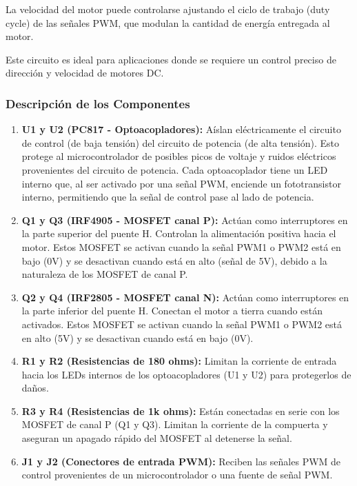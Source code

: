 \documentclass{article}
\begin{document}
La velocidad del motor puede controlarse ajustando el ciclo de trabajo (duty cycle) de las señales PWM, que modulan la cantidad de energía entregada al motor.

Este circuito es ideal para aplicaciones donde se requiere un control preciso de dirección y velocidad de motores DC.

\subsubsection{Descripción de los Componentes}

\begin{enumerate}

    \item \textbf{U1 y U2 (PC817 - Optoacopladores):} Aíslan eléctricamente el circuito de control (de baja tensión) del circuito de potencia (de alta tensión). Esto protege al microcontrolador de posibles picos de voltaje y ruidos eléctricos provenientes del circuito de potencia.
    Cada optoacoplador tiene un LED interno que, al ser activado por una señal PWM, enciende un fototransistor interno, permitiendo que la señal de control pase al lado de potencia.
    
    \item \textbf{Q1 y Q3 (IRF4905 - MOSFET canal P):} Actúan como interruptores en la parte superior del puente H. Controlan la alimentación positiva hacia el motor. Estos MOSFET se activan cuando la señal PWM1 o PWM2 está en bajo (0V) y se desactivan cuando está en alto (señal de 5V), debido a la naturaleza de los MOSFET de canal P.
    
    \item \textbf{Q2 y Q4 (IRF2805 - MOSFET canal N):} Actúan como interruptores en la parte inferior del puente H. Conectan el motor a tierra cuando están activados. Estos MOSFET se activan cuando la señal PWM1 o PWM2 está en alto (5V) y se desactivan cuando está en bajo (0V).
    
    \item \textbf{R1 y R2 (Resistencias de 180 ohms):} Limitan la corriente de entrada hacia los LEDs internos de los optoacopladores (U1 y U2) para protegerlos de daños.
    
    \item \textbf{R3 y R4 (Resistencias de 1k ohms):} Están conectadas en serie con los MOSFET de canal P (Q1 y Q3). Limitan la corriente de la compuerta y aseguran un apagado rápido del MOSFET al detenerse la señal.
    
    \item \textbf{J1 y J2 (Conectores de entrada PWM):} Reciben las señales PWM de control provenientes de un microcontrolador o una fuente de señal PWM.
    

\end{enumerate}
\end{document}

